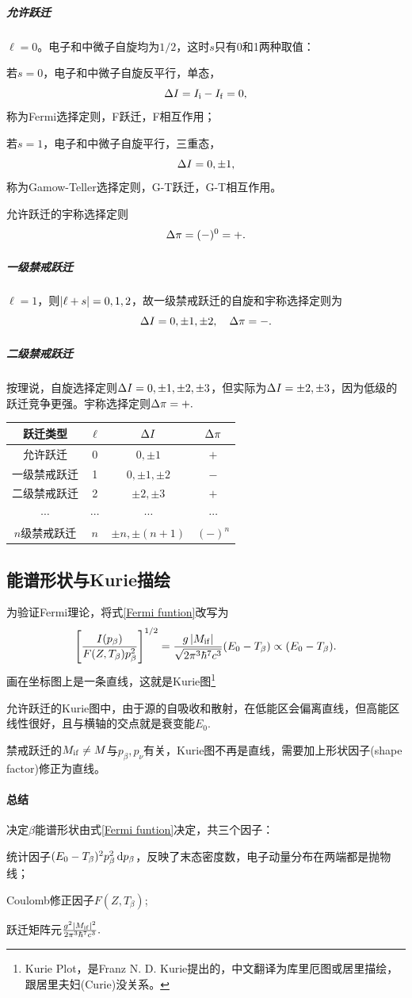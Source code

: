 \subparagraph{允许跃迁}
$\ell=0$。电子和中微子自旋均为$1/2$，这时$s$只有0和1两种取值：
\begin{compactenum}
	\item 若$s=0$，电子和中微子自旋反平行，单态，
	\[
		\Delta I=I_{\mathrm{i}}-I_{\mathrm{f}}=0,
	\]
	称为Fermi选择定则，F跃迁，F相互作用；
	\item 若$s=1$，电子和中微子自旋平行，三重态，
	\[
		\Delta I=0,\pm 1,
	\]
	称为Gamow-Teller选择定则，G-T跃迁，G-T相互作用。
\end{compactenum}
允许跃迁的宇称选择定则
\[
	\Delta\pi=(-)^0=+.
\]
\subparagraph{一级禁戒跃迁}
$\ell=1$，则$\left\lvert\ell+s\right\rvert=0,1,2$，故一级禁戒跃迁的自旋和宇称选择定则为
\[
	\Delta I=0,\pm 1,\pm 2,\quad\Delta\pi=-.
\]
\subparagraph{二级禁戒跃迁}
按理说，自旋选择定则$\Delta I=0,\pm 1,\pm 2,\pm 3$，但实际为$\Delta I=\pm 2,\pm 3$，因为低级的跃迁竞争更强。宇称选择定则$\Delta\pi=+.$
\begin{center}
	\begin{tabular}{cccc}
		\toprule
		跃迁类型&$\ell$&$\Delta I$&$\Delta\pi$\\
		\midrule
		允许跃迁&0&$0,\pm 1$&$+$\\
		一级禁戒跃迁&1&$0,\pm 1,\pm 2$&$-$\\
		二级禁戒跃迁&2&$\pm 2,\pm 3$&$+$\\
		$\cdots$&$\cdots$&$\cdots$&$\cdots$\\
		$n$级禁戒跃迁&$n$&$\pm n,\pm(n+1)$&$(-)^n$\\
		\bottomrule
	\end{tabular}
\end{center}

\subsection{\textbeta 能谱形状与Kurie描绘}

为验证Fermi理论，将式\eqref{Fermi funtion}改写为
\[
	\left[\frac{I(p_\beta)}{F(Z,T_\beta)p_\beta^2}\right]^{1/2}=\frac{g\left\lvert M_{\mathrm{i}\mathrm{f}}\right\rvert}{\sqrt{2\pi^3\hbar^7c^3}}(E_0-T_\beta)\propto(E_0-T_\beta).
\]
画在坐标图上是一条直线，这就是Kurie图\footnote{Kurie Plot，是Franz N. D. Kurie提出的，中文翻译为库里厄图或居里描绘，跟居里夫妇(Curie)没关系。}

允许跃迁的Kurie图中，由于源的自吸收和散射，在低能区会偏离直线，但高能区线性很好，且与横轴的交点就是衰变能$E_0.$

禁戒跃迁的$M_{\mathrm{i}\mathrm{f}}\neq M$与$p_\beta,p_\nu$有关，Kurie图不再是直线，需要加上形状因子(shape factor)修正为直线。
\paragraph{总结}决定$\beta$能谱形状由式\eqref{Fermi funtion}决定，共三个因子：
\begin{compactenum}
	\item 统计因子$(E_0-T_\beta)^2p_\beta^2\mathop{}\!\mathrm{d} p_\beta$，反映了末态密度数，电子动量分布在两端都是抛物线；
	\item Coulomb修正因子$F(Z,T_\beta)$;
	\item 跃迁矩阵元$\frac{g^2\left\lvert M_{\mathrm{i}\mathrm{f}}\right\rvert^2}{2\pi^3\hbar^7c^3}.$
\end{compactenum}


